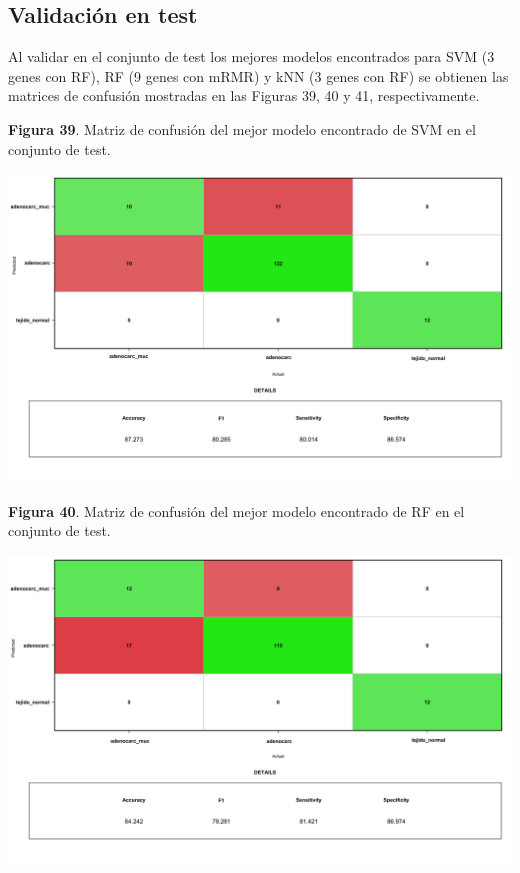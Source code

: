 \subsection{Validación en test}

Al validar en el conjunto de test los mejores modelos encontrados para SVM (3 genes con RF), RF (9 genes con mRMR) y kNN (3 genes con RF) se obtienen las matrices de confusión mostradas en las Figuras 39, 40 y 41, respectivamente.

\newpage
\begin{center}
	\textbf{Figura 39}. Matriz de confusión del mejor modelo encontrado de SVM en el conjunto de test.
\end{center}
\begin{center}
	\includegraphics[width=1\textwidth]{figuras/39_cr_multiclase_15_svm_matriz_confusion_mejor_metodo.png} 
\end{center}

\begin{center}
	\textbf{Figura 40}. Matriz de confusión del mejor modelo encontrado de RF en el conjunto de test.
\end{center}
\begin{center}
	\includegraphics[width=1\textwidth]{figuras/40_cr_multiclase_25_rf_matriz_confusion_mejor_metodo.png} 
\end{center}

